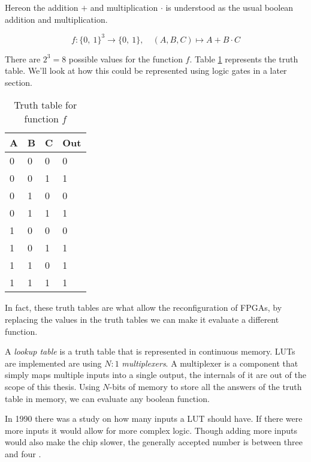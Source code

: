 \begin{example}
    \label{ex:boolean_function}

    Hereon the addition $+$ and multiplication $\cdot$ is understood as the
    usual boolean addition and multiplication.

    \begin{equation} \label{eq:examle_eq}
    f \colon \{0,\ 1\}^3 \rightarrow \{0,\ 1\}, \quad (A, B, C) \mapsto A + B \cdot C
    \end{equation}

    There are $2^3 = 8$ possible values for the function $f$. Table
    \ref{tab:example_truth_table} represents the truth table. We'll look at how
    this could be represented using logic gates in a later section.
    \begin{table}[H]
        \centering
        \begin{tabular}{|l|l|l|l|}
            \hline
            A & B & C & Out \\ \hline
            0 & 0 & 0 & 0   \\ \hline
            0 & 0 & 1 & 1   \\ \hline
            0 & 1 & 0 & 0   \\ \hline
            0 & 1 & 1 & 1   \\ \hline
            1 & 0 & 0 & 0   \\ \hline
            1 & 0 & 1 & 1   \\ \hline
            1 & 1 & 0 & 1   \\ \hline
            1 & 1 & 1 & 1   \\ \hline
        \end{tabular}
        \caption{Truth table for function $f$}
        \label{tab:example_truth_table}
    \end{table}


    In fact, these truth tables are what allow the reconfiguration of FPGAs, by
    replacing the values in the truth tables we can make it evaluate a different
    function.
\end{example}

\begin{definition}

    A \textit{lookup table} is a truth table that is represented in continuous
    memory. LUTs are implemented are using $N:1$ \textit{multiplexers}. A
    multiplexer is a component that simply maps multiple inputs into a single
    output, the internals of it are out of the scope of this thesis. Using $N$-bits
    of memory to store all the answers of the truth table in memory, we can evaluate
    any boolean function.

    In 1990 there was a study on how many inputs a LUT should have. If
    there were more inputs it would allow for more complex logic. Though adding more
    inputs would also make the chip slower, the generally accepted number is
    between three and four \citep{RoseArchitecture}.

\end{definition}

